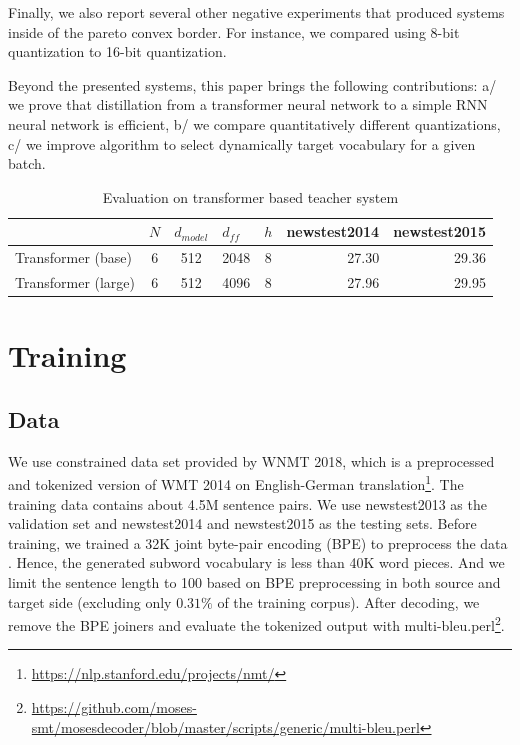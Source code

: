 \documentclass[11pt,a4paper]{article}
\begin{document}
Finally, we also report several other negative experiments that produced systems inside of the pareto convex border. For instance, we compared using 8-bit quantization to 16-bit quantization.

Beyond the presented systems, this paper brings the following contributions: a/ we prove that distillation from a transformer neural network to a simple RNN neural network is efficient, b/ we compare quantitatively different quantizations, c/ we improve algorithm to select dynamically target vocabulary for a given batch.

\begin{table}[]
\centering
\begin{tabular}{lccccrr}
\hline
                    & \multicolumn{1}{l}{\(\displaystyle N \)} & \multicolumn{1}{l}{\(\displaystyle d_{model} \)} & \multicolumn{1}{l}{\(\displaystyle d_{ff} \)} & \multicolumn{1}{l}{\(\displaystyle h \)} & \multicolumn{1}{l}{newstest2014} & \multicolumn{1}{l}{newstest2015} \\ \hline
Transformer (base)  & 6                     & 512                        & 2048                  & 8                        & 27.30                            & 29.36                            \\ \hline
Transformer (large) & 6                     & 512                        & 4096                  & 8                        & 27.96                            & 29.95                            \\ \hline
\end{tabular}
\caption{Evaluation on transformer based teacher system}
\label{table:transformer}
\end{table}

\section{Training}

\subsection{Data}
\label{data}

We use constrained data set provided by WNMT 2018, which is a preprocessed and tokenized version of WMT 2014 on English-German translation\footnote{\url{https://nlp.stanford.edu/projects/nmt/}}. The training data contains about 4.5M sentence pairs. We use newstest2013 as the validation set and newstest2014 and newstest2015 as the testing sets. Before training, we trained a 32K joint byte-pair encoding (BPE) to preprocess the data \cite{sennrich2015neural}. Hence, the generated subword vocabulary is less than 40K word pieces. And we limit the sentence length to 100 based on BPE preprocessing in both source and target side (excluding only $0.31\%$ of the training corpus). After decoding, we remove the BPE joiners and evaluate the tokenized output with multi-bleu.perl\footnote{\url{https://github.com/moses-smt/mosesdecoder/blob/master/scripts/generic/multi-bleu.perl}}.
\end{document}
